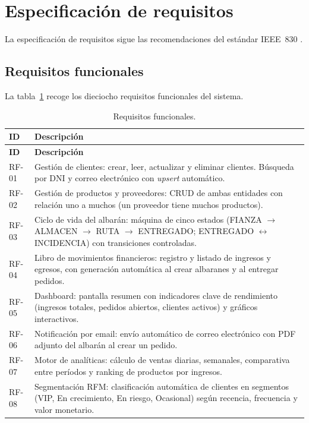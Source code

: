\documentclass[12pt,twoside,titlepage]{report}
\begin{document}
\section{Especificación de requisitos}

La especificación de requisitos sigue las recomendaciones del estándar IEEE~830 \cite{ieee830}.

\subsection{Requisitos funcionales}

La tabla~\ref{tab:rf} recoge los dieciocho requisitos funcionales del sistema.

\begin{longtable}{lp{11cm}}
  \caption{Requisitos funcionales.} \label{tab:rf} \\
  \toprule
  \textbf{ID} & \textbf{Descripción} \\
  \midrule
  \endfirsthead
  \toprule
  \textbf{ID} & \textbf{Descripción} \\
  \midrule
  \endhead
  RF-01 & Gestión de clientes: crear, leer, actualizar y eliminar clientes. Búsqueda por DNI y correo electrónico con \emph{upsert} automático. \\
  RF-02 & Gestión de productos y proveedores: CRUD de ambas entidades con relación uno a muchos (un proveedor tiene muchos productos). \\
  RF-03 & Ciclo de vida del albarán: máquina de cinco estados (FIANZA $\to$ ALMACEN $\to$ RUTA $\to$ ENTREGADO; ENTREGADO $\leftrightarrow$ INCIDENCIA) con transiciones controladas. \\
  RF-04 & Libro de movimientos financieros: registro y listado de ingresos y egresos, con generación automática al crear albaranes y al entregar pedidos. \\
  RF-05 & Dashboard: pantalla resumen con indicadores clave de rendimiento (ingresos totales, pedidos abiertos, clientes activos) y gráficos interactivos. \\
  RF-06 & Notificación por email: envío automático de correo electrónico con PDF adjunto del albarán al crear un pedido. \\
  RF-07 & Motor de analíticas: cálculo de ventas diarias, semanales, comparativa entre períodos y ranking de productos por ingresos. \\
  RF-08 & Segmentación RFM: clasificación automática de clientes en segmentos (VIP, En crecimiento, En riesgo, Ocasional) según recencia, frecuencia y valor monetario. \\

\end{longtable}
\end{document}
